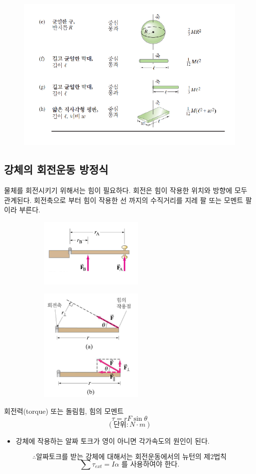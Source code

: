 \documentclass[12pt,a4paper]{article}
\begin{document}
\begin{figure}[h!]
    \centering
    \includegraphics[width=15cm]{2024-05-26 224246.png}
\end{figure}
\clearpage
\subsection{강체의 회전운동 방정식}
물체를 회전시키기 위해서는 힘이 필요하다. 회전은 힘이 작용한 위치와 방향에 모두 
관계된다. 회전축으로 부터 힘이 작용한 선 까지의 수직거리를 지레 팔 또는 모멘트
팔이라 부른다.
\begin{figure}[h!]
    \centering
    \begin{subfigure}[]{0.4\textwidth}
        \includegraphics[width=5cm]{2024-05-26 224858.png}
    \end{subfigure}
    \begin{subfigure}[]{0.4\textwidth}
        \includegraphics[width=5cm]{2024-05-26 224656.png}
    \end{subfigure}
\end{figure}
회전력(torque) 또는 돌림힘, 힘의 모멘트
$$\tau=rF\sin\theta$$
$$(\textrm{단위}: N \cdot m)$$
\begin{itemize}
    \item 강체에 작용하는 알짜 토크가 영이 아니면 각가속도의 원인이 된다.
\end{itemize}
$$\therefore\textrm{알짜토크를 받는 강체에 대해서는 회전운동에서의 뉴턴의 제2법칙}$$
$$\sum\tau_{ext}=I\alpha \textrm{ 를 사용하여야 한다.}$$
\end{document}
